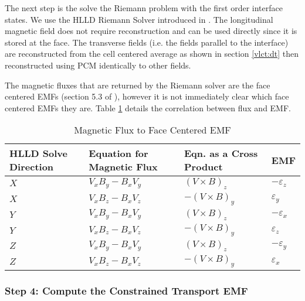 The next step is the solve the Riemann problem with the first order interface states. We use the HLLD Riemann Solver introduced in \cite{hlld_2005}. The longitudinal magnetic field does not require reconstruction and can be used directly since it is stored at the face. The transverse fields (i.e. the fields parallel to the interface) are reconstructed from the cell centered average as shown in section \ref{vlct:dt} then reconstructed using PCM identically to other fields.

The magnetic fluxes that are returned by the Riemann solver are the face centered EMFs (section 5.3 of \cite{stone_athena_2008}), however it is not immediately clear which face centered EMFs they are. Table \ref{table:emf} details the correlation between flux and EMF.

\begin{table}[!ht]
    \centering
        \caption{Magnetic Flux to Face Centered EMF}
    \begin{tabular}{|l|l|l|l|}
    \hline
        HLLD Solve Direction & Equation for Magnetic Flux & Eqn. as a Cross Product & EMF \\ \hline
        $ X $ & $ V_x B_y - B_x V_y $ & $  (V \times B)_z $ & $ -\varepsilon_z $ \\ \hline
        $ X $ & $ V_x B_z - B_x V_z $ & $ -(V \times B)_y $ & $  \varepsilon_y $ \\ \hline
        $ Y $ & $ V_x B_y - B_x V_y $ & $  (V \times B)_z $ & $ -\varepsilon_x $ \\ \hline
        $ Y $ & $ V_x B_z - B_x V_z $ & $ -(V \times B)_y $ & $  \varepsilon_z $ \\ \hline
        $ Z $ & $ V_x B_y - B_x V_y $ & $  (V \times B)_z $ & $ -\varepsilon_y $ \\ \hline
        $ Z $ & $ V_x B_z - B_x V_z $ & $ -(V \times B)_y $ & $  \varepsilon_x $ \\ \hline
    \end{tabular}
    \label{table:emf}
\end{table}

\subsubsection{Step 4: Compute the Constrained Transport EMF}
\label{vlct:emf}

